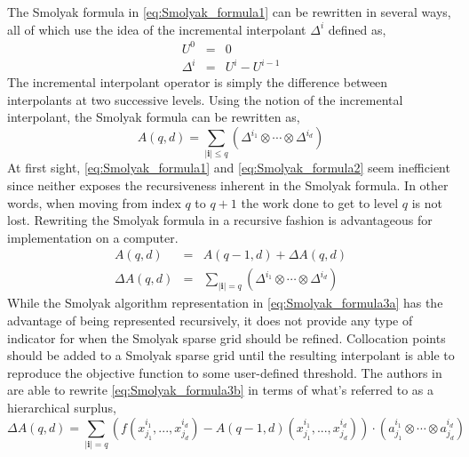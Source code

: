 The Smolyak formula in \ref{eq:Smolyak_formula1} can be rewritten in several ways, all of which use the idea of the incremental interpolant $\Delta^i$ defined as,
\begin{eqnarray} \label{eq:incremental_interpolant}
    U^0 &=& 0 \nonumber \\
    \Delta^i &=& U^i - U^{i-1}
\end{eqnarray}
The incremental interpolant operator is simply the difference between interpolants at two successive levels. Using the notion of the incremental interpolant, the Smolyak formula can be rewritten as,
\begin{equation} \label{eq:Smolyak_formula2}
    A\left(q,d\right) =
     \sum_{\vert\textbf{i}\vert\leq q}
      \left(\Delta^{i_1}\otimes\cdots\otimes\Delta^{i_d}\right)
\end{equation}   
At first sight, \ref{eq:Smolyak_formula1} and \ref{eq:Smolyak_formula2} seem inefficient since neither exposes the recursiveness inherent in the Smolyak formula. In other words, when moving from index $q$ to $q+1$ the work done to get to level $q$ is not lost. Rewriting the Smolyak formula in a recursive fashion is advantageous for implementation on a computer.
\begin{eqnarray}
\label{eq:Smolyak_formula3a}
    A(q,d) &=& A(q-1,d) + \Delta A(q,d) \\
\label{eq:Smolyak_formula3b}
    \Delta A(q,d) &=& \sum_{\vert\textbf{i}\vert = q}
     \left(\Delta^{i_1}\otimes\cdots\otimes\Delta^{i_d}\right)
\end{eqnarray}
While the Smolyak algorithm representation in \ref{eq:Smolyak_formula3a} has the advantage of being represented recursively, it does not provide any type of indicator for when the Smolyak sparse grid should be refined. Collocation points should be added to a Smolyak sparse grid until the resulting interpolant is able to reproduce the objective function to some user-defined threshold. The authors in \cite{AHSGC} are able to rewrite \ref{eq:Smolyak_formula3b} in terms of what's referred to as a hierarchical surplus, 
\begin{equation} \label{eq:hierarchical_surplus}
    \Delta A(q,d) = \sum_{\vert\textbf{i}\vert=q}
     \left(f(x_{j_1}^{i_1},...,x_{j_d}^{i_d}) - 
      A(q-1,d)(x_{j_1}^{i_1},...,x_{j_d}^{i_d})\right)\cdot
       \left(a_{j_1}^{i_1}\otimes\cdots\otimes a_{j_d}^{i_d}\right)
\end{equation}
